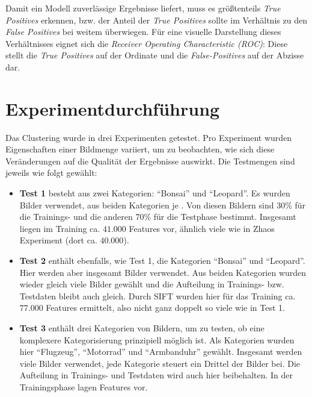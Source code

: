 Damit ein Modell zuverlässige Ergebnisse liefert, muss es größtenteils \textit{True Positives} erkennen, bzw. der Anteil der \textit{True Positives} sollte im Verhältnis zu den \textit{False Positives} bei weitem überwiegen. Für eine visuelle Darstellung dieses Verhältnisses eignet sich die \textit{Receiver Operating Characteristic (ROC)}: Diese stellt die \textit{True Positives} auf der Ordinate und die \textit{False-Positives} auf der Abzisse dar.

\section{Experimentdurchführung}

Das Clustering wurde in drei Experimenten getestet. Pro Experiment wurden Eigenschaften einer Bildmenge variiert, um zu beobachten, wie sich diese Veränderungen auf die Qualität der Ergebnisse auswirkt. Die Testmengen sind jeweils wie folgt gewählt:

\begin{itemize}
	\item \textbf{Test 1} besteht aus zwei Kategorien: \enquote{Bonsai} und \enquote{Leopard}. Es wurden  Bilder verwendet, aus beiden Kategorien je . Von diesen Bildern sind 30\% für die Trainings- und die anderen 70\% für die Testphase bestimmt. Insgesamt liegen im Training ca. $41.000$ Features vor, ähnlich viele wie in Zhaos Experiment (dort ca. $40.000$).
	\item \textbf{Test 2} enthält ebenfalls, wie Test 1, die Kategorien \enquote{Bonsai} und \enquote{Leopard}. Hier werden aber insgesamt  Bilder verwendet. Aus beiden Kategorien wurden wieder gleich viele Bilder gewählt und die Aufteilung in Trainings- bzw. Testdaten bleibt auch gleich. Durch SIFT wurden hier für das Training ca. $77.000$ Features ermittelt, also nicht ganz doppelt so viele wie in Test 1.
	\item \textbf{Test 3} enthält drei Kategorien von Bildern, um zu testen, ob eine komplexere Kategorisierung prinzipiell möglich ist. Als Kategorien wurden hier \enquote{Flugzeug}, \enquote{Motorrad} und \enquote{Armbanduhr} gewählt. Insgesamt werden  viele Bilder verwendet, jede Kategorie steuert ein Drittel der Bilder bei. Die Aufteilung in Trainings- und Testdaten wird auch hier beibehalten. In der Trainingsphase lagen  Features vor.
\end{itemize} 

